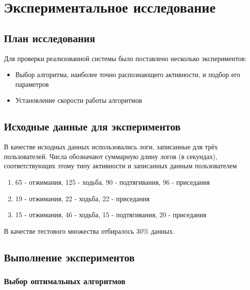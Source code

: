
\chapter{Экспериментальное исследование}

\section{План исследования}

Для проверки реализованной системы было поставлено несколько экспериментов:

\begin{itemize}
\item Выбор алгоритма, наиболее точно распознающего активности, и подбор его параметров
\item Установление скорости работы алгоритмов
\end{itemize}


\section{Исходные данные для экспериментов}

В качестве исходных данных использовались логи, записанные для трёх пользователей. Числа обозначают суммарную длину логов (в секундах), соответствующих этому типу активности и записанных данным пользователем

\begin{enumerate}
\item 65 - отжимания, 125 - ходьба, 90 - подтягивания, 96 - приседания %
\item 19 - отжимания, 22 - ходьба, 22 - приседания %
\item 15 - отжимания, 46 - ходьба, 15 - подтягивания, 20 - приседания %
\end{enumerate}

В качестве тестового множества отбиралось 30\% данных.


\section{Выполнение экспериментов}

\subsection{Выбор оптимальных алгоритмов}

